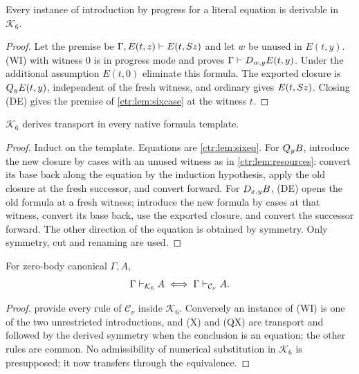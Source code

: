 \begin{lemma}\label{ctr:lem:sixprog}
Every instance of introduction by progress for a literal equation is derivable in
$\mathcal K_6$.
\end{lemma}
\begin{proof}
Let the premise be $\Gamma,E(t,z)\vdash E(t,S z)$ and let $w$ be unused in $E(t,y)$.
(WI) with witness $0$ is in progress mode and proves $\Gamma\vdash D_{w,y}E(t,y)$. Under
the additional assumption $E(t,0)$ eliminate this formula. The exported closure is
$Q_{y}E(t,y)$, independent of the fresh witness, and ordinary  gives
$E(t,S z)$. Closing (DE) gives the premise of \cref{ctr:lem:sixcase} at the witness $t$.
\end{proof}

\begin{lemma}\label{ctr:lem:sixtransport}
$\mathcal K_6$ derives transport in every native formula template.
\end{lemma}
\begin{proof}
Induct on the template. Equations are \cref{ctr:lem:sixeq}. For $Q_{y}B$, introduce the new
closure by cases with an unused witness as in \cref{ctr:lem:resources}: convert its base
back along the equation by the induction hypothesis, apply the old closure at the fresh
successor, and convert forward. For $D_{x,y}B$, (DE) opens the old formula at a fresh
witness; introduce the new formula by cases at that witness, convert its base back, use the
exported closure, and convert the successor forward. The other direction of the equation is
obtained by symmetry. Only symmetry, cut and renaming are used.
\end{proof}

\begin{theorem}\label{ctr:thm:six}
For zero-body canonical $\Gamma,A$,
\[
 \Gamma\vdash_{\mathcal K_6}A\iff\Gamma\vdash_{\mathcal C_\nu}A .
\]
\end{theorem}
\begin{proof}
 provide every rule
of $\mathcal C_\nu$ inside $\mathcal K_6$. Conversely an instance of (WI) is one of the two
unrestricted introductions, and (X) and (QX) are transport and  followed by the
derived symmetry when the conclusion is an equation; the other rules are common. No
admissibility of numerical substitution in $\mathcal K_6$ is presupposed; it now transfers
through the equivalence.
\end{proof}

